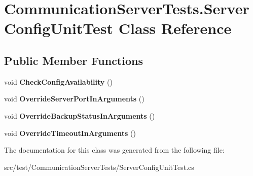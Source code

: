 \hypertarget{class_communication_server_tests_1_1_server_config_unit_test}{}\section{Communication\+Server\+Tests.\+Server\+Config\+Unit\+Test Class Reference}
\label{class_communication_server_tests_1_1_server_config_unit_test}
\subsection*{Public Member Functions}
\begin{DoxyCompactItemize}
\item 
\hypertarget{class_communication_server_tests_1_1_server_config_unit_test_a0d61891c3a0cf8b3200a733e361f8de5}{}void {\bfseries Check\+Config\+Availability} ()\label{class_communication_server_tests_1_1_server_config_unit_test_a0d61891c3a0cf8b3200a733e361f8de5}

\item 
\hypertarget{class_communication_server_tests_1_1_server_config_unit_test_a992474a1e65a3d50840c69dce0cbced9}{}void {\bfseries Override\+Server\+Port\+In\+Arguments} ()\label{class_communication_server_tests_1_1_server_config_unit_test_a992474a1e65a3d50840c69dce0cbced9}

\item 
\hypertarget{class_communication_server_tests_1_1_server_config_unit_test_a15a89cd2edcf090ae8aaca6b69e0e021}{}void {\bfseries Override\+Backup\+Status\+In\+Arguments} ()\label{class_communication_server_tests_1_1_server_config_unit_test_a15a89cd2edcf090ae8aaca6b69e0e021}

\item 
\hypertarget{class_communication_server_tests_1_1_server_config_unit_test_a8cd1faa4d847072f60c6028daad542c9}{}void {\bfseries Override\+Timeout\+In\+Arguments} ()\label{class_communication_server_tests_1_1_server_config_unit_test_a8cd1faa4d847072f60c6028daad542c9}

\end{DoxyCompactItemize}


The documentation for this class was generated from the following file\+:\begin{DoxyCompactItemize}
\item 
src/test/\+Communication\+Server\+Tests/Server\+Config\+Unit\+Test.\+cs\end{DoxyCompactItemize}

